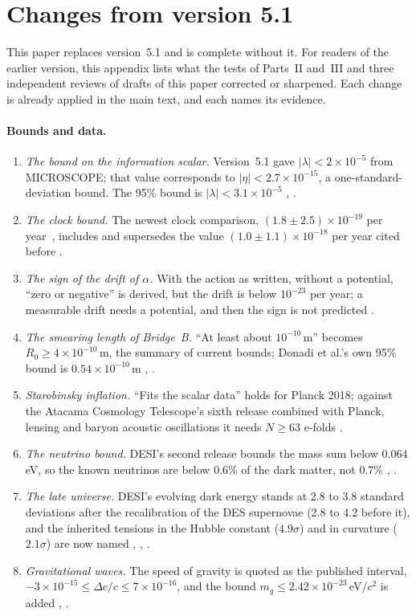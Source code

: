 \section{Changes from version 5.1}\label{app:changes}\label{sec:corrections}

This paper replaces version~5.1 and is complete without it. For readers of the earlier version, this appendix lists what the tests of
Parts~II and~III and three independent reviews of drafts of this paper corrected or sharpened. Each change is already applied in the
main text, and each names its evidence.

\paragraph{Bounds and data.}
\begin{enumerate}[nosep]
\item \emph{The bound on the information scalar.} Version~5.1 gave $|\lambda|<2\times10^{-5}$ from MICROSCOPE; that value corresponds to
$|\eta|<2.7\times10^{-15}$, a one-standard-deviation bound. The 95\% bound is $|\lambda|<3.1\times10^{-5}$ , .
\item \emph{The clock bound.} The newest clock comparison, $(1.8\pm2.5)\times10^{-19}$ per year~\cite{filzinger2023}, includes and
supersedes the value $(1.0\pm1.1)\times10^{-18}$ per year cited before .
\item \emph{The sign of the drift of $\alpha$.} With the action as written, without a potential, ``zero or negative'' is derived, but the
drift is below $10^{-23}$ per year; a measurable drift needs a potential, and then the sign is not predicted .
\item \emph{The smearing length of Bridge~B.} ``At least about $10^{-10}$\,m'' becomes $R_0\ge4\times10^{-10}$\,m, the summary of current
bounds; Donadi et al.'s own 95\% bound is $0.54\times10^{-10}$\,m , .
\item \emph{Starobinsky inflation.} ``Fits the scalar data'' holds for Planck 2018; against the Atacama Cosmology Telescope's sixth
release combined with Planck, lensing and baryon acoustic oscillations it needs $N\ge63$ e-folds .
\item \emph{The neutrino bound.} DESI's second release bounds the mass sum below $0.064$\,eV, so the known neutrinos are below 0.6\% of
the dark matter, not 0.7\% , .
\item \emph{The late universe.} DESI's evolving dark energy stands at 2.8 to 3.8 standard deviations after the recalibration of the DES
supernovae (2.8 to 4.2 before it), and the inherited tensions in the Hubble constant ($4.9\sigma$) and in curvature ($2.1\sigma$) are now
named , , .
\item \emph{Gravitational waves.} The speed of gravity is quoted as the published interval, $-3\times10^{-15}\le\Delta c/c\le7\times10^{-16}$,
and the bound $m_g\le2.42\times10^{-23}$\,eV$/c^2$ is added , .
\end{enumerate}

